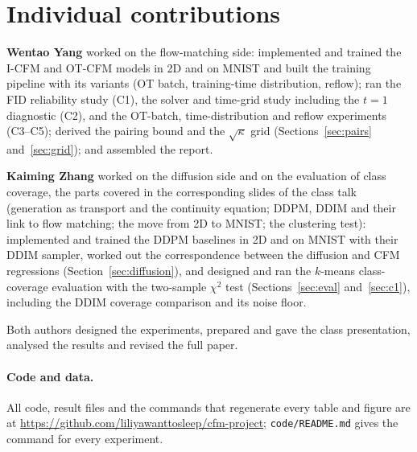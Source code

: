 \section*{Individual contributions}
\textbf{Wentao Yang} worked on the flow-matching side: implemented and trained the I-CFM and OT-CFM models in 2D and on MNIST and built the training pipeline with its variants (OT batch, training-time distribution, reflow); ran the FID reliability study (C1), the solver and time-grid study including the $t=1$ diagnostic (C2), and the OT-batch, time-distribution and reflow experiments (C3--C5); derived the pairing bound and the $\sqrt\kappa$ grid (Sections~\ref{sec:pairs} and~\ref{sec:grid}); and assembled the report.

\textbf{Kaiming Zhang} worked on the diffusion side and on the evaluation of class coverage, the parts covered in the corresponding slides of the class talk (generation as transport and the continuity equation; DDPM, DDIM and their link to flow matching; the move from 2D to MNIST; the clustering test): implemented and trained the DDPM baselines in 2D and on MNIST with their DDIM sampler, worked out the correspondence between the diffusion and CFM regressions (Section~\ref{sec:diffusion}), and designed and ran the $k$-means class-coverage evaluation with the two-sample $\chi^2$ test (Sections~\ref{sec:eval} and~\ref{sec:c1}), including the DDIM coverage comparison and its noise floor.

Both authors designed the experiments, prepared and gave the class presentation, analysed the results and revised the full paper.

\paragraph{Code and data.} All code, result files and the commands that regenerate every table and figure are at \url{https://github.com/liliyawanttosleep/cfm-project}; \texttt{code/README.md} gives the command for every experiment.
